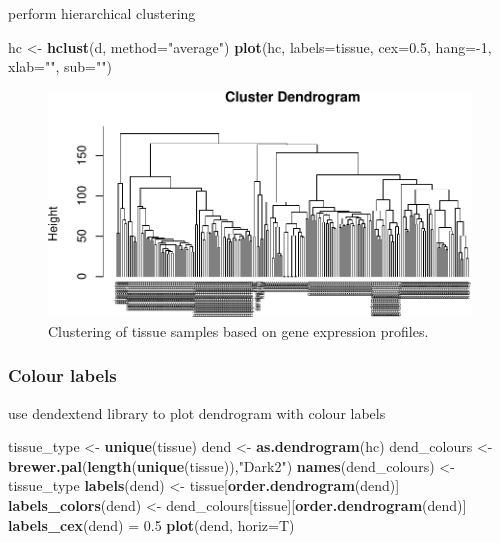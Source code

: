 \documentclass[]{book}
\newenvironment{Shaded}{\begin{snugshade}}{\end{snugshade}}
\newcommand{\KeywordTok}[1]{\textcolor[rgb]{0.13,0.29,0.53}{\textbf{{#1}}}}
\newcommand{\DataTypeTok}[1]{\textcolor[rgb]{0.13,0.29,0.53}{{#1}}}
\newcommand{\DecValTok}[1]{\textcolor[rgb]{0.00,0.00,0.81}{{#1}}}
\newcommand{\FloatTok}[1]{\textcolor[rgb]{0.00,0.00,0.81}{{#1}}}
\newcommand{\StringTok}[1]{\textcolor[rgb]{0.31,0.60,0.02}{{#1}}}
\newcommand{\NormalTok}[1]{{#1}}
\theoremstyle{definition}
\theoremstyle{definition}
\theoremstyle{definition}
\theoremstyle{remark}
\begin{document}
perform hierarchical clustering

\begin{Shaded}
\begin{Highlighting}[]
\NormalTok{hc <-}\StringTok{ }\KeywordTok{hclust}\NormalTok{(d, }\DataTypeTok{method=}\StringTok{"average"}\NormalTok{)}
\KeywordTok{plot}\NormalTok{(hc, }\DataTypeTok{labels=}\NormalTok{tissue, }\DataTypeTok{cex=}\FloatTok{0.5}\NormalTok{, }\DataTypeTok{hang=}\NormalTok{-}\DecValTok{1}\NormalTok{, }\DataTypeTok{xlab=}\StringTok{""}\NormalTok{, }\DataTypeTok{sub=}\StringTok{""}\NormalTok{)}
\end{Highlighting}
\end{Shaded}

\begin{figure}

{\centering \includegraphics[width=1\linewidth]{09-clustering_files/figure-latex/tissueDendrogram-1} 

}

\caption{Clustering of tissue samples based on gene expression profiles. }\label{fig:tissueDendrogram}
\end{figure}

\subsubsection{Colour labels}\label{colour-labels}

use dendextend library to plot dendrogram with colour labels

\begin{Shaded}
\begin{Highlighting}[]
\NormalTok{tissue_type <-}\StringTok{ }\KeywordTok{unique}\NormalTok{(tissue)}
\NormalTok{dend <-}\StringTok{ }\KeywordTok{as.dendrogram}\NormalTok{(hc)}
\NormalTok{dend_colours <-}\StringTok{ }\KeywordTok{brewer.pal}\NormalTok{(}\KeywordTok{length}\NormalTok{(}\KeywordTok{unique}\NormalTok{(tissue)),}\StringTok{"Dark2"}\NormalTok{)}
\KeywordTok{names}\NormalTok{(dend_colours) <-}\StringTok{ }\NormalTok{tissue_type}
\KeywordTok{labels}\NormalTok{(dend) <-}\StringTok{ }\NormalTok{tissue[}\KeywordTok{order.dendrogram}\NormalTok{(dend)]}
\KeywordTok{labels_colors}\NormalTok{(dend) <-}\StringTok{ }\NormalTok{dend_colours[tissue][}\KeywordTok{order.dendrogram}\NormalTok{(dend)]}
\KeywordTok{labels_cex}\NormalTok{(dend) =}\StringTok{ }\FloatTok{0.5}
\KeywordTok{plot}\NormalTok{(dend, }\DataTypeTok{horiz=}\NormalTok{T)}
\end{Highlighting}
\end{Shaded}
\end{document}

